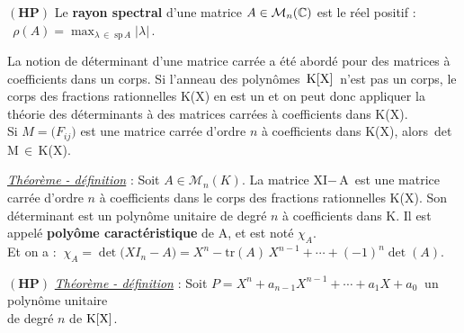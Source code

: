 \vspace{1.3cm}

\(\left(\mathbf{H} \mathbf{P} \right)\) Le \textbf{rayon spectral} d'une matrice \(A\in \mathcal{M}_n(\mathbb{C})\) est le réel positif : \(\ \ \displaystyle \rho\left(A\right)=\max_{\lambda\,\in\; \text{sp}\,A}|\lambda |\,\).

\vspace{1.3cm}

\begin{small}
    La notion de déterminant d'une matrice carrée a été abordé pour des matrices à coefficients dans un corps. Si l'anneau des polynômes $\,\text{K}[\text{X}]\,$ n'est pas un corps, le corps des fractions rationnelles K(X) en est un et on peut donc appliquer la théorie des déterminants à des matrices carrées à coefficients dans K(X).\\
    Si \(M=\bigl(F_{ij}\bigr)\) est une matrice carrée d'ordre $n$ à coefficients dans K(X), alors\, det\,M\(\,\in\,\)K(X).
\end{small}

\vspace{0.3cm}

\underline{\emph{Théorème - définition}} : Soit \(A\in \mathcal{M}_n(K)\). La matrice XI$-\,$A\, est une matrice carrée d'ordre $n$ à coefficients dans le corps des fractions rationnelles K(X). Son déterminant est un polynôme unitaire de degré $n$ à coefficients dans K. Il est appelé \textbf{polyôme caractéristique} de A, et est noté $\chi_A$.\vspace{0.1cm}\\
Et on a : \(\ \chi_A=\det\bigl(XI_n-A\bigr)=X^n-\text{tr}(A)\,X^{n-1}+\cdots+(-1)^n\det(A).\)

\vspace{1.9cm}

\(\left(\mathbf{HP}\right)\) \underline{\emph{Théorème - définition}} : Soit \(P=X^n+a_{n-1}X^{n-1}+\cdots+a_1X+a_0\ \) un polynôme unitaire\vspace{0.1cm}\\
de degré $n$ de $\text{K}[\text{X}]$.\vspace{-0.3cm}

